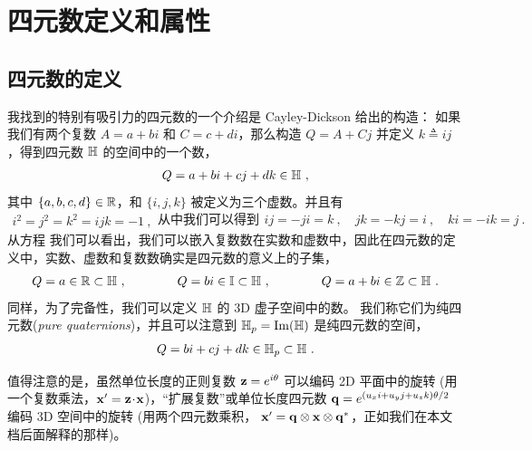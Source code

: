 

\section{四元数定义和属性}

\subsection{四元数的定义}

我找到的特别有吸引力的四元数的一个介绍是 Cayley-Dickson 给出的构造：
如果我们有两个复数 $A=a+bi$ 和 $C=c+di$，那么构造 $Q=A+Cj$ 并定义 $k\triangleq ij$ ，得到四元数 ${\mathbb H}$ 的空间中的一个数，
%
\begin{align}
Q = a + bi + cj + dk \in{\mathbb H} ~, \label{equ:ijkQuat}
\end{align}%
%
其中 $\{a,b,c,d\}\in{\mathbb R}$，和 $\{i,j,k\}$ 被定义为三个虚数。并且有
%
\begin{subequations}
\label{equ:quatAlgebra}
\begin{align}
i^2=j^2=k^2=ijk=-1~,
\end{align}%
%
从中我们可以得到
%
\begin{align}
ij = -ji = k ~, \quad jk=-kj=i~, \quad ki=-ik=j~.
\end{align}
\end{subequations}
%
从方程  我们可以看出，我们可以嵌入复数数在实数和虚数中，因此在四元数的定义中，实数、虚数和复数数确实是四元数的意义上的子集，
%
\begin{align}
Q = a \in {\mathbb R} \subset {\mathbb H}~,
\qquad\qquad 
Q=bi \in {\mathbb I} \subset {\mathbb H}~,
\qquad\qquad 
Q=a+bi \in {\mathbb Z} \subset {\mathbb H}~.
\end{align}
%
同样，为了完备性，我们可以定义 ${\mathbb H}$ 的 3D 虚子空间中的数。
我们称它们为纯四元数(\emph{pure quaternions})，并且可以注意到 ${\mathbb H}_p=\operatorname{Im}({\mathbb H})$ 是纯四元数的空间，
%
\begin{align}
Q=bi+cj+dk \in{\mathbb H}_p \subset{\mathbb H}~.
\end{align}


值得注意的是，虽然单位长度的正则复数 ${\bf z}=e^{i\theta}$ 可以编码 2D 平面中的旋转 (用一个复数乘法，${\bf x}'={\bf z}\!\cdot\!{\bf x}$)，“扩展复数”或单位长度四元数 ${\bf q}=e^{(u_xi+u_yj+u_zk)\theta/2}$ 编码 3D 空间中的旋转 (用两个四元数乘积， ${\bf x}'={\bf q}\otimes{\bf x}\otimes{\bf q}^*$，正如我们在本文档后面解释的那样)。



